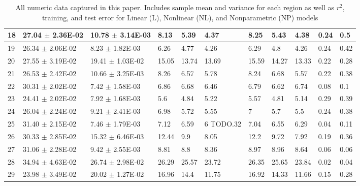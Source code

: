 \documentclass[12pt]{article}
\begin{document}
\begin{landscape}
\begin{table}
\begin{tabular}{|l|l|l|l|l|l|l|l|l|l|l|}
18&27.04 $\pm$ 2.36E-02& 10.78 $\pm$ 3.14E-03&8.13&5.39&4.37&8.25&5.43&4.38&0.24&0.5\\\hline
19&26.34 $\pm$ 2.06E-02& 8.23 $\pm$ 1.82E-03&6.26&4.77&4.26&6.29&4.8&4.26&0.24&0.42\\\hline
20&27.55 $\pm$ 3.19E-02& 19.41 $\pm$ 1.03E-02&15.05&13.74&13.69&15.59&14.27&13.33&0.22&0.28\\\hline
21&26.53 $\pm$ 2.42E-02& 10.66 $\pm$ 3.25E-03&8.26&6.57&5.78&8.24&6.68&5.57&0.22&0.38\\\hline
22&30.31 $\pm$ 2.02E-02& 7.42 $\pm$ 1.58E-03&6.86&6.68&6.46&6.79&6.62&6.74&0.08&0.1\\\hline
23&24.41 $\pm$ 2.02E-02& 7.92 $\pm$ 1.68E-03&5.6&4.84&5.22&5.57&4.81&5.14&0.29&0.39\\\hline
24&26.04 $\pm$ 2.24E-02& 9.21 $\pm$ 2.41E-03&6.98&5.72&5.55&7&5.7&5.5&0.24&0.38\\\hline
25&31.40 $\pm$ 2.15E-02& 7.46 $\pm$ 1.79E-03&7.12&6.59&6
TODO.32&7.04&6.55&6.29&0.04&0.11\\\hline
26&30.33 $\pm$ 2.85E-02& 15.32 $\pm$ 6.46E-03&12.44&9.9&8.05&12.2&9.72&7.92&0.19&0.36\\\hline
27&31.06 $\pm$ 2.28E-02& 9.42 $\pm$ 2.55E-03&8.81&8.8&8.36&8.97&8.96&8.64&0.06&0.06\\\hline
28&34.94 $\pm$ 4.63E-02& 26.74 $\pm$ 2.98E-02&26.29&25.57&23.72&26.35&25.65&23.84&0.02&0.04\\\hline
29&23.98 $\pm$ 3.49E-02& 20.02 $\pm$ 1.27E-02&16.96&14.4&11.75&16.92&14.33&11.66&0.15&0.28\\\hline
\end{tabular}
\caption{All numeric data captured in this paper. Includes sample mean and variance for each region as well as $r^2$, training, and test error for Linear (L), Nonlinear (NL), and Nonparametric (NP) models}
\label{resultstable}
\end{table}
\end{landscape}
\end{document}
